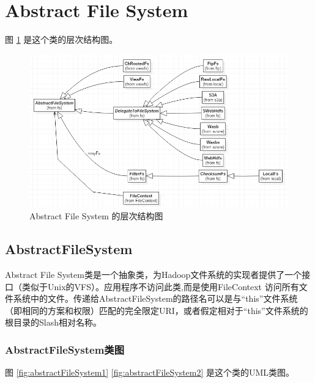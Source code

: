 \section{Abstract File System}

图 \ref{fig:architecture} 是这个类的层次结构图。
\begin{figure}
\centering
\includegraphics[width=1\linewidth]{UML/abstractfilesystem/architecture.PNG}
\caption{Abstract File System 的层次结构图}
\label{fig:architecture}
\end{figure}

\subsection{AbstractFileSystem}
Abstract File System类是一个抽象类，为Hadoop文件系统的实现者提供了一个接口（类似于Unix的VFS）。应用程序不访问此类,而是使用FileContext 访问所有文件系统中的文件。传递给AbstractFileSystem的路径名可以是与“this”文件系统（即相同的方案和权限）匹配的完全限定URI，或者假定相对于“this”文件系统的根目录的Slash相对名称。

\subsubsection{AbstractFileSystem类图}
图 \ref{fig:abstractFileSystem1}  \ref{fig:abstractFileSystem2} 是这个类的UML类图。

